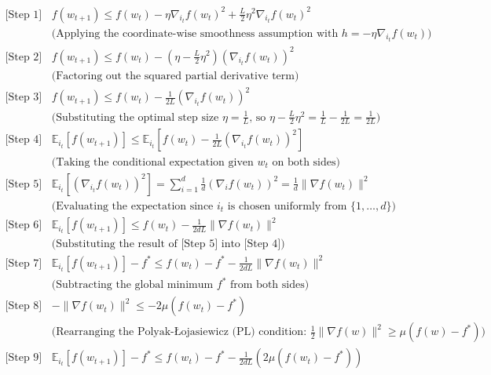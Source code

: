 \documentclass[11pt]{article}
\begin{document}
\begin{align}
    \text{[Step 1]} \quad & f(w_{t+1}) \leq f(w_t) - \eta \nabla_{i_t} f(w_t)^2 + \frac{L}{2} \eta^2 \nabla_{i_t} f(w_t)^2 \\
    & \text{(Applying the coordinate-wise smoothness assumption with $h = -\eta \nabla_{i_t} f(w_t)$)} \nonumber \\[10pt]
    \text{[Step 2]} \quad & f(w_{t+1}) \leq f(w_t) - \left( \eta - \frac{L}{2} \eta^2 \right) (\nabla_{i_t} f(w_t))^2 \\
    & \text{(Factoring out the squared partial derivative term)} \nonumber \\[10pt]
    \text{[Step 3]} \quad & f(w_{t+1}) \leq f(w_t) - \frac{1}{2L} (\nabla_{i_t} f(w_t))^2 \\
    & \text{(Substituting the optimal step size $\eta = \frac{1}{L}$, so $\eta - \frac{L}{2}\eta^2 = \frac{1}{L} - \frac{1}{2L} = \frac{1}{2L}$)} \nonumber \\[10pt]
    \text{[Step 4]} \quad & \mathbb{E}_{i_t}[f(w_{t+1})] \leq \mathbb{E}_{i_t} \left[ f(w_t) - \frac{1}{2L} (\nabla_{i_t} f(w_t))^2 \right] \\
    & \text{(Taking the conditional expectation given $w_t$ on both sides)} \nonumber \\[10pt]
    \text{[Step 5]} \quad & \mathbb{E}_{i_t} [(\nabla_{i_t} f(w_t))^2] = \sum_{i=1}^d \frac{1}{d} (\nabla_i f(w_t))^2 = \frac{1}{d} \|\nabla f(w_t)\|^2 \\
    & \text{(Evaluating the expectation since $i_t$ is chosen uniformly from $\{1, \dots, d\}$)} \nonumber \\[10pt]
    \text{[Step 6]} \quad & \mathbb{E}_{i_t}[f(w_{t+1})] \leq f(w_t) - \frac{1}{2dL} \|\nabla f(w_t)\|^2 \\
    & \text{(Substituting the result of [Step 5] into [Step 4])} \nonumber \\[10pt]
    \text{[Step 7]} \quad & \mathbb{E}_{i_t}[f(w_{t+1})] - f^* \leq f(w_t) - f^* - \frac{1}{2dL} \|\nabla f(w_t)\|^2 \\
    & \text{(Subtracting the global minimum $f^*$ from both sides)} \nonumber \\[10pt]
    \text{[Step 8]} \quad & - \|\nabla f(w_t)\|^2 \leq - 2\mu (f(w_t) - f^*) \\
    & \text{(Rearranging the Polyak-\L{}ojasiewicz (PL) condition: $\frac{1}{2}\|\nabla f(w)\|^2 \geq \mu(f(w)-f^*)$)} \nonumber \\[10pt]
    \text{[Step 9]} \quad & \mathbb{E}_{i_t}[f(w_{t+1})] - f^* \leq f(w_t) - f^* - \frac{1}{2dL} \left( 2\mu (f(w_t) - f^*) \right) \\

\end{align}
\end{document}
